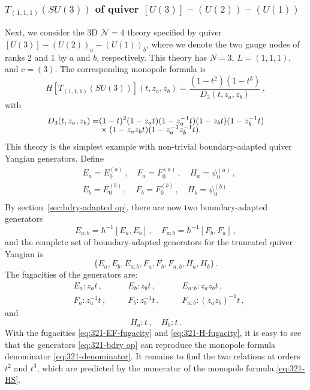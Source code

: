 \documentclass[12pt,a4paper]{article}
\begin{document}
\subsubsection{$T_{(1,1,1)}(SU(3))$ of quiver $[U(3)]-(U(2))-(U(1))$}
Next, we consider the 3D $\mathcal N=4$ theory specified by quiver $[U(3)]-(U(2))_a-(U(1))_b$, where we denote the two gauge nodes of ranks 2 and 1 by $a$ and $b$, respectively. This theory has $N=3$, $L=(1,1,1)$, and $c=(3)$. The corresponding monopole formula is
\begin{equation}
 H[T_{(1,1,1)}(SU(3))](t,z_a,z_b)
 =\frac{(1-t^2)(1-t^3)}{D_3(t,z_a,z_b)}\,,
 \label{eq:321-HS}
\end{equation}
with
\begin{align}
 D_3(t,z_a,z_b)=&(1-t)^2(1-z_at)(1-z_a^{-1}t)
 (1-z_bt)(1-z_b^{-1}t)
 \notag\\[-2mm]
 &\times(1-z_az_bt)(1-z_a^{-1}z_b^{-1}t).
 \label{eq:321-denominator}
\end{align}
This theory is the simplest example with non-trivial boundary-adapted quiver Yangian generators. Define
\begin{equation}
\begin{aligned}
     &E_a=E^{(a)}_0\,,\quad F_a=F^{(a)}_0\,,\quad H_a=\psi^{(a)}_0\,,\\
     &E_b=E^{(b)}_0\,,\quad F_b=F^{(b)}_0\,,\quad H_b=\psi^{(b)}_0\,.\\
\end{aligned}
\end{equation}
By section~\ref{sec:bdry-adapted op}, there are now two boundary-adapted generators
\begin{equation}
    E_{a;b}=\hbar^{-1}[E_a,E_b]\,,\quad F_{a:b}=\hbar^{-1}[F_b,F_a]\,,
\end{equation}
and the complete set of boundary-adapted generators for the truncated quiver Yangian is
\begin{equation}
    \{E_a,E_b,E_{a:b},F_a,F_b,F_{a:b},H_a,H_b\}\,.
    \label{eq:321-bdry op}
\end{equation}
The fugacities of the generators are:
\begin{equation}
\begin{aligned}
     &E_a: z_at\,,\quad &&E_b: z_b t\,,\quad &&E_{a:b}:z_az_bt\,,\\
     &F_a: z_a^{-1}t\,,\quad &&F_b: z_b^{-1} t\,,\quad &&F_{a:b}:(z_az_b)^{-1}t\,,
\end{aligned}\label{eq:321-EF-fugacity}
\end{equation}
and
\begin{equation}\label{eq:321-H-fugacity}
    H_a:t\,,\quad H_b:t\,.
\end{equation}
With the fugacities \eqref{eq:321-EF-fugacity} and \eqref{eq:321-H-fugacity}, it is easy to see that the generators \eqref{eq:321-bdry op} can reproduce the monopole formula denominator \eqref{eq:321-denominator}. It remains to find the two relations at orders $t^2$ and $t^3$, which are predicted by the numerator of the monopole formula \eqref{eq:321-HS}.
\end{document}
